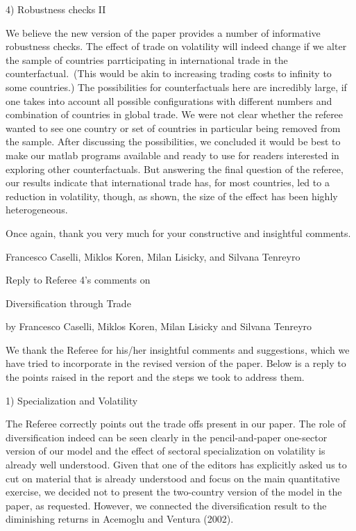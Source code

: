 \documentclass[12pt]{article}
\begin{document}
4) Robustness checks II

We believe the new version of the paper provides a number of informative
robustness checks. The effect of trade on volatility will indeed change if
we alter the sample of countries parrticipating in international trade in
the counterfactual.\ (This would be akin to increasing trading costs to
infinity to some countries.) The possibilities for counterfactuals here are
incredibly large, if one takes into account all possible configurations with
different numbers and combination of countries in global trade. We were not
clear whether the referee wanted to see one country or set of countries in
particular being removed from the sample. After discussing the
possibilities, we concluded it would be best to make our matlab programs
available and ready to use for readers interested in exploring other
counterfactuals. But answering the final question of the referee, our
results indicate that international trade has, for most countries, led to a
reduction in volatility, though, as shown, the size of the effect has been
highly heterogeneous.

\medskip \medskip \bigskip

Once again, thank you very much for your constructive and insightful
comments.

Francesco Caselli, Miklos Koren, Milan Lisicky, and Silvana Tenreyro

\pagebreak

\begin{center}
\thispagestyle{plain}\setcounter{page}{1}

Reply to Referee 4's comments on

{\Large Diversification through Trade}

by Francesco Caselli, Miklos Koren, Milan Lisicky and Silvana
Tenreyro\medskip \medskip \bigskip
\end{center}

We thank the Referee for his/her insightful comments and suggestions, which
we have tried to incorporate in the revised version of the paper. Below is a
reply to the points raised in the report and the steps we took to address
them.

\bigskip

1) Specialization and Volatility

The Referee correctly points out the trade offs present in our paper. The
role of diversification indeed can be seen clearly in the pencil-and-paper
one-sector version of our model and the effect of sectoral specialization on
volatility is already well understood. Given that one of the editors has
explicitly asked us to cut on material that is already understood and focus
on the main quantitative exercise, we decided not to present the two-country
version of the model in the paper, as requested. However, we connected the
diversification result to the diminishing returns in Acemoglu and Ventura
(2002).
\end{document}
